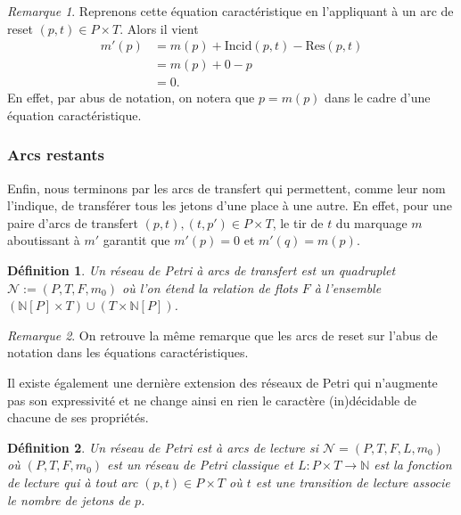 \documentclass{article}
\newtheorem{definition}{Définition}
\theoremstyle{remark}
\newtheorem*{remark}{Remarque}
\theoremstyle{remark}
\newcommand{\prototype}[3]{#1 : #2 \rightarrow #3}
\newcommand{\incid}{\mathrm{Incid}}
\newcommand{\reset}{\mathrm{Res}}
\begin{document}
\begin{remark}
    Reprenons cette équation caractéristique en l'appliquant à un arc de reset $(p, t) \in P \times T$. Alors il vient
    \begin{align*}
        m'(p) & = m(p) + \incid(p, t) - \reset(p, t) \\
              & = m(p) + 0       - p \\
              & = 0.
    \end{align*}
    En effet, par abus de notation, on notera que $p = m(p)$ dans le cadre d'une équation caractéristique.
\end{remark}

\subsubsection{Arcs restants}

Enfin, nous terminons par les arcs de transfert qui permettent, comme leur nom l'indique, de transférer tous les jetons d'une place à une autre. En effet, pour une paire d'arcs de transfert $(p, t), (t, p') \in P \times T$, le tir de $t$ du marquage $m$ aboutissant à $m'$ garantit que $m'(p) = 0$ et $m'(q) = m(p)$.

\begin{definition}
    Un réseau de Petri à arcs de transfert est un quadruplet $\mathcal{N} := (P, T, F, m_0)$ où l'on étend la relation de flots $F$ à l'ensemble $(\mathbb{N}[P] \times T) \cup (T \times \mathbb{N}[P])$.
\end{definition}

\begin{remark}
    On retrouve la même remarque que les arcs de reset sur l'abus de notation dans les équations caractéristiques.
\end{remark}

Il existe également une dernière extension des réseaux de Petri qui n'augmente pas son expressivité et ne change ainsi en rien le caractère (in)décidable de chacune de ses propriétés.

\begin{definition}
    Un réseau de Petri est à arcs de lecture si $\mathcal{N} = (P, T, F, L, m_0)$ où $(P, T, F, m_0)$ est un réseau de Petri classique et $\prototype{L}{P \times T}{\mathbb{N}}$ est la fonction de lecture qui à tout arc $(p, t) \in P \times T$ où $t$ est une transition de lecture associe le nombre de jetons de $p$.
\end{definition}
\end{document}
